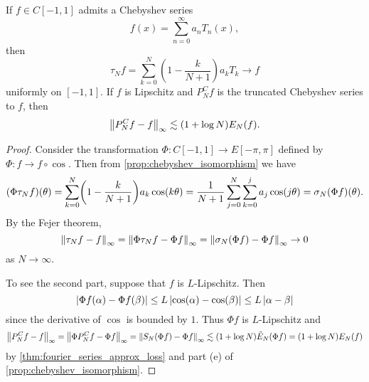 \begin{theorem}
    If $f\in C[-1,1]$ admits a Chebyshev series
    \begin{equation*}
        f(x) = \sum_{n=0}^\infty a_nT_n(x),
    \end{equation*}
    then 
    \begin{equation*}
        \tau_Nf = \sum_{k=0}^{N}(1-\frac{k}{N+1})a_kT_k \to f 
    \end{equation*}
    uniformly on $[-1,1]$. If $f$ is Lipschitz and $P_N^Cf$ is 
    the truncated Chebyshev series to $f$, then 
    \begin{equation*}
        \left\lVert {P_N^Cf - f} \right\rVert_\infty \lesssim (1+\log N)E_N(f).
    \end{equation*}
\end{theorem}
\begin{proof}
    Consider the transformation $\Phi:C[-1,1]\to E[-\pi,\pi]$ defined by 
    $\Phi:f\to f\circ\cos$. Then from \cref{prop:chebyshev_isomorphism} we 
    have 
    \begin{equation*}
        (\Phi\tau_Nf)(\theta) = \sum_{k=0}^{N}\pth{1-\frac{k}{N+1}}a_k\cos(k\theta) 
        = \frac{1}{N+1}\sum_{j=0}^N\sum_{k=0}^j a_j\cos(j\theta) = \sigma_N(\Phi f)(\theta). 
    \end{equation*}
    By the Fejer theorem, 
    \begin{equation*}
        \left\lVert {\tau_Nf - f} \right\rVert_\infty = \left\lVert {\Phi\tau_Nf - \Phi f} \right\rVert_\infty = \left\lVert {\sigma_N(\Phi f) - \Phi f} \right\rVert_\infty \to 0
    \end{equation*}
    as $N\to\infty$. 

    To see the second part, suppose that $f$ is $L$-Lipschitz. Then
    \begin{equation*}
        \left\lvert {\Phi f(\alpha) - \Phi f(\beta)} \right\rvert \leq L\left\lvert {\cos(\alpha) - \cos(\beta)} \right\rvert \leq L\left\lvert {\alpha - \beta} \right\rvert
    \end{equation*}
    since the derivative of $\cos$ is bounded by $1$. Thus $\Phi f$ 
    is $L$-Lipschitz and 
    \begin{equation*}
        \left\lVert {P_N^Cf - f} \right\rVert_\infty = \left\lVert {\Phi P_N^Cf - \Phi f} \right\rVert_\infty 
        = \left\lVert {S_N(\Phi f) - \Phi f} \right\rVert_\infty \lesssim (1+\log N)\tilde{E}_N(\Phi f) 
        = (1+\log N)E_N(f)
    \end{equation*}
    by \cref{thm:fourier_series_approx_loss} and part (e) of \cref{prop:chebyshev_isomorphism}.
\end{proof}

